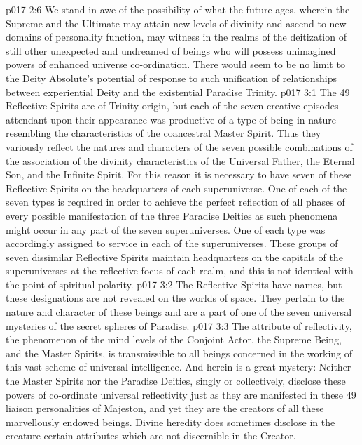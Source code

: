 \vs p017 2:6 We stand in awe of the possibility of what the future ages, wherein the Supreme and the Ultimate may attain new levels of divinity and ascend to new domains of personality function, may witness in the realms of the deitization of still other unexpected and undreamed of beings who will possess unimagined powers of enhanced universe co\hyp{}ordination. There would seem to be no limit to the Deity Absolute’s potential of response to such unification of relationships between experiential Deity and the existential Paradise Trinity.
\vs p017 3:1 The 49 Reflective Spirits are of Trinity origin, but each of the seven creative episodes attendant upon their appearance was productive of a type of being in nature resembling the characteristics of the coancestral Master Spirit. Thus they variously reflect the natures and characters of the seven possible combinations of the association of the divinity characteristics of the Universal Father, the Eternal Son, and the Infinite Spirit. For this reason it is necessary to have seven of these Reflective Spirits on the headquarters of each superuniverse. One of each of the seven types is required in order to achieve the perfect reflection of all phases of every possible manifestation of the three Paradise Deities as such phenomena might occur in any part of the seven superuniverses. One of each type was accordingly assigned to service in each of the superuniverses. These groups of seven dissimilar Reflective Spirits maintain headquarters on the capitals of the superuniverses at the reflective focus of each realm, and this is not identical with the point of spiritual polarity.
\vs p017 3:2 The Reflective Spirits have names, but these designations are not revealed on the worlds of space. They pertain to the nature and character of these beings and are a part of one of the seven universal mysteries of the secret spheres of Paradise.
\vs p017 3:3 The attribute of reflectivity, the phenomenon of the mind levels of the Conjoint Actor, the Supreme Being, and the Master Spirits, is transmissible to all beings concerned in the working of this vast scheme of universal intelligence. And herein is a great mystery: Neither the Master Spirits nor the Paradise Deities, singly or collectively, disclose these powers of co\hyp{}ordinate universal reflectivity just as they are manifested in these 49 liaison personalities of Majeston, and yet they are the creators of all these marvellously endowed beings. Divine heredity does sometimes disclose in the creature certain attributes which are not discernible in the Creator.
